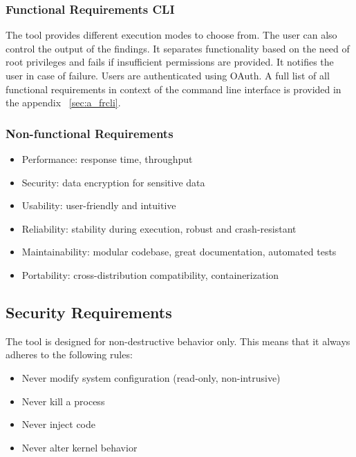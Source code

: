 \subsubsection{Functional Requirements CLI}

The tool provides different execution modes to choose from. The user can also control the output of the findings. It separates functionality based on the need of root privileges and fails if insufficient permissions are provided. It notifies the user in case of failure.  Users are authenticated using OAuth. \newline\newline A full list of all functional requirements in context of the command line interface is provided in the appendix ~\ref{sec:a_frcli}.

\subsubsection{Non-functional Requirements}

\begin{itemize}
	\item Performance: response time, throughput
	\item Security: data encryption for sensitive data
	\item Usability: user-friendly and intuitive
	\item Reliability: stability during execution, robust and crash-resistant
	\item Maintainability: modular codebase, great documentation, automated tests
	\item Portability: cross-distribution compatibility, containerization
\end{itemize}

\subsection{Security Requirements}

The tool is designed for non-destructive behavior only. This means that it always adheres to the following rules:

\begin{itemize}
	\item Never modify system configuration (read-only, non-intrusive)
	\item Never kill a process
	\item Never inject code
	\item Never alter kernel behavior
\end{itemize}

